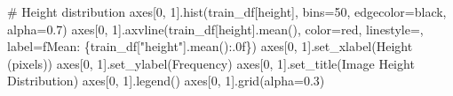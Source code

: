 \documentclass[
  letterpaper,
  DIV=11,
  numbers=noendperiod]{scrartcl}
\newenvironment{Shaded}{\begin{snugshade}}{\end{snugshade}}
\newcommand{\CommentTok}[1]{\textcolor[rgb]{0.37,0.37,0.37}{#1}}
\newcommand{\DecValTok}[1]{\textcolor[rgb]{0.68,0.00,0.00}{#1}}
\newcommand{\FloatTok}[1]{\textcolor[rgb]{0.68,0.00,0.00}{#1}}
\newcommand{\NormalTok}[1]{\textcolor[rgb]{0.00,0.23,0.31}{#1}}
\newcommand{\OperatorTok}[1]{\textcolor[rgb]{0.37,0.37,0.37}{#1}}
\newcommand{\SpecialCharTok}[1]{\textcolor[rgb]{0.37,0.37,0.37}{#1}}
\newcommand{\SpecialStringTok}[1]{\textcolor[rgb]{0.13,0.47,0.30}{#1}}
\newcommand{\StringTok}[1]{\textcolor[rgb]{0.13,0.47,0.30}{#1}}
\renewenvironment{Shaded}{%
  \begin{tcolorbox}[%
    enhanced,%
    colback=codebg,%
    colframe=codebg,%
    borderline west={3pt}{0pt}{sectionblue},%
    boxrule=0pt,%
    arc=0pt,%
    boxsep=5pt,%
    left=2mm,%
    right=2mm,%
    top=2mm,%
    bottom=2mm%
  ]%
}{%
  \end{tcolorbox}%
}
\begin{document}
\begin{Shaded}
\begin{Highlighting}[]
\CommentTok{\# Height distribution}
\NormalTok{axes[}\DecValTok{0}\NormalTok{, }\DecValTok{1}\NormalTok{].hist(train\_df[}\StringTok{\textquotesingle{}height\textquotesingle{}}\NormalTok{], bins}\OperatorTok{=}\DecValTok{50}\NormalTok{, edgecolor}\OperatorTok{=}\StringTok{\textquotesingle{}black\textquotesingle{}}\NormalTok{, alpha}\OperatorTok{=}\FloatTok{0.7}\NormalTok{)}
\NormalTok{axes[}\DecValTok{0}\NormalTok{, }\DecValTok{1}\NormalTok{].axvline(train\_df[}\StringTok{\textquotesingle{}height\textquotesingle{}}\NormalTok{].mean(), color}\OperatorTok{=}\StringTok{\textquotesingle{}red\textquotesingle{}}\NormalTok{, linestyle}\OperatorTok{=}\StringTok{\textquotesingle{}{-}{-}\textquotesingle{}}\NormalTok{,}
\NormalTok{                   label}\OperatorTok{=}\SpecialStringTok{f\textquotesingle{}Mean: }\SpecialCharTok{\{}\NormalTok{train\_df[}\StringTok{"height"}\NormalTok{]}\SpecialCharTok{.}\NormalTok{mean()}\SpecialCharTok{:.0f\}}\SpecialStringTok{\textquotesingle{}}\NormalTok{)}
\NormalTok{axes[}\DecValTok{0}\NormalTok{, }\DecValTok{1}\NormalTok{].set\_xlabel(}\StringTok{\textquotesingle{}Height (pixels)\textquotesingle{}}\NormalTok{)}
\NormalTok{axes[}\DecValTok{0}\NormalTok{, }\DecValTok{1}\NormalTok{].set\_ylabel(}\StringTok{\textquotesingle{}Frequency\textquotesingle{}}\NormalTok{)}
\NormalTok{axes[}\DecValTok{0}\NormalTok{, }\DecValTok{1}\NormalTok{].set\_title(}\StringTok{\textquotesingle{}Image Height Distribution\textquotesingle{}}\NormalTok{)}
\NormalTok{axes[}\DecValTok{0}\NormalTok{, }\DecValTok{1}\NormalTok{].legend()}
\NormalTok{axes[}\DecValTok{0}\NormalTok{, }\DecValTok{1}\NormalTok{].grid(alpha}\OperatorTok{=}\FloatTok{0.3}\NormalTok{)}


\end{Highlighting}
\end{Shaded}
\end{document}
